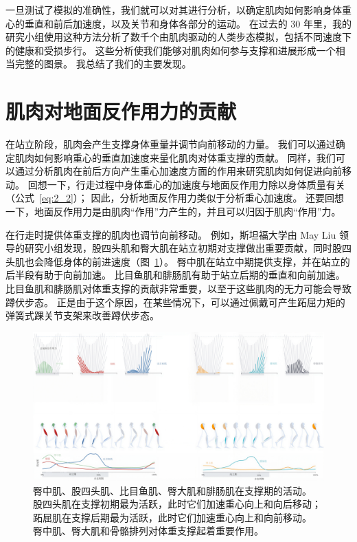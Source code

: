 一旦测试了模拟的准确性，我们就可以对其进行分析，以确定肌肉如何影响身体重心的垂直和前后加速度，以及关节和身体各部分的运动。
在过去的 30 年里，我的研究小组使用这种方法分析了数千个由肌肉驱动的人类步态模拟，包括不同速度下的健康和受损步行。
这些分析使我们能够对肌肉如何参与支撑和进展形成一个相当完整的图景。
我总结了我们的主要发现。


\section{肌肉对地面反作用力的贡献}

在站立阶段，肌肉会产生支撑身体重量并调节向前移动的力量。
我们可以通过确定肌肉如何影响重心的垂直加速度来量化肌肉对体重支撑的贡献。
同样，我们可以通过分析肌肉在前后方向产生重心加速度方面的作用来研究肌肉如何促进向前移动。
回想一下，行走过程中身体重心的加速度与地面反作用力除以身体质量有关（公式~\ref{eq:2_2}）；
因此，分析地面反作用力类似于分析重心加速度。
还要回想一下，地面反作用力是由肌肉“作用”力产生的，并且可以归因于肌肉“作用”力。


在行走时提供体重支撑的肌肉也调节向前移动。
例如，斯坦福大学由 May Liu 领导的研究小组发现，股四头肌和臀大肌在站立初期对支撑做出重要贡献，同时股四头肌也会降低身体的前进速度（图~\ref{fig:11_2}）。
臀中肌在站立中期提供支撑，并在站立的后半段有助于向前加速。
比目鱼肌和腓肠肌有助于站立后期的垂直和向前加速。
比目鱼肌和腓肠肌对体重支撑的贡献非常重要，以至于这些肌肉的无力可能会导致蹲伏步态。
正是由于这个原因，在某些情况下，可以通过佩戴可产生跖屈力矩的弹簧式踝关节支架来改善蹲伏步态。


\begin{figure}[!htb]
	\centering
	\includegraphics[width=1.0\linewidth]{chap11/11_2}
	\caption{臀中肌、股四头肌、比目鱼肌、臀大肌和腓肠肌在支撑期的活动。
		股四头肌在支撑初期最为活跃，此时它们加速重心向上和向后移动；
		跖屈肌在支撑后期最为活跃，此时它们加速重心向上和向前移动。
		臀中肌、臀大肌和骨骼排列对体重支撑起着重要作用\cite{liu2008muscle}。\label{fig:11_2}}
\end{figure}


